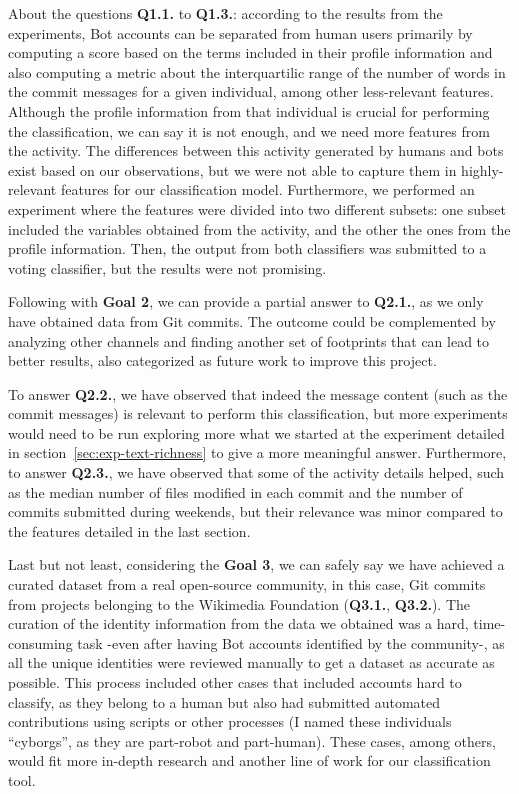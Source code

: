 \documentclass[a4paper, 12pt]{book}
\begin{document}
About the questions \textbf{Q1.1. }to \textbf{Q1.3.}: according to the results from the experiments, Bot accounts can be separated from human users primarily by computing a score based on the terms included in their profile information and also computing a metric about the interquartilic range of the number of words in the commit messages for a given individual, among other less-relevant features. Although the profile information from that individual is crucial for performing the classification, we can say it is not enough, and we need more features from the activity. The differences between this activity generated by humans and bots exist based on our observations, but we were not able to capture them in highly-relevant features for our classification model. Furthermore, we performed an experiment where the features were divided into two different subsets: one subset included the variables obtained from the activity, and the other the ones from the profile information. Then, the output from both classifiers was submitted to a voting classifier, but the results were not promising.

Following with \textbf{Goal 2}, we can provide a partial answer to \textbf{Q2.1.}, as we only have obtained data from Git commits. The outcome could be complemented by analyzing other channels and finding another set of footprints that can lead to better results, also categorized as future work to improve this project.

To answer \textbf{Q2.2.}, we have observed that indeed the message content (such as the commit messages) is relevant to perform this classification, but more experiments would need to be run exploring more what we started at the experiment detailed in section~\ref{sec:exp-text-richness} to give a more meaningful answer. Furthermore, to answer \textbf{Q2.3.}, we have observed that some of the activity details helped, such as the median number of files modified in each commit and the number of commits submitted during weekends, but their relevance was minor compared to the features detailed in the last section.

Last but not least, considering the \textbf{Goal 3}, we can safely say we have achieved a curated dataset from a real open-source community, in this case, Git commits from projects belonging to the Wikimedia Foundation (\textbf{Q3.1.}, \textbf{Q3.2.}). The curation of the identity information from the data we obtained was a hard, time-consuming task -even after having Bot accounts identified by the community-, as all the unique identities were reviewed manually to get a dataset as accurate as possible. This process included other cases that included accounts hard to classify, as they belong to a human but also had submitted automated contributions using scripts or other processes (I named these individuals ``cyborgs'', as they are part-robot and part-human). These cases, among others, would fit more in-depth research and another line of work for our classification tool.
\end{document}
